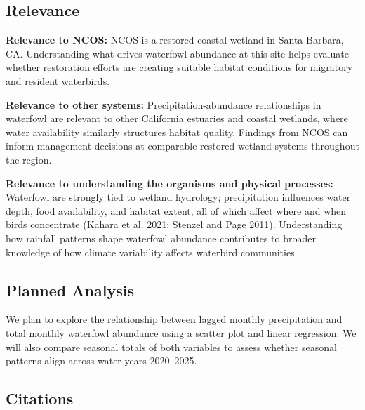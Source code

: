 \documentclass[
  letterpaper,
  DIV=11,
  numbers=noendperiod]{scrartcl}
\begin{document}
\subsection{Relevance}\label{relevance}

\textbf{Relevance to NCOS:} NCOS is a restored coastal wetland in Santa
Barbara, CA. Understanding what drives waterfowl abundance at this site
helps evaluate whether restoration efforts are creating suitable habitat
conditions for migratory and resident waterbirds.

\textbf{Relevance to other systems:} Precipitation-abundance
relationships in waterfowl are relevant to other California estuaries
and coastal wetlands, where water availability similarly structures
habitat quality. Findings from NCOS can inform management decisions at
comparable restored wetland systems throughout the region.

\textbf{Relevance to understanding the organisms and physical
processes:} Waterfowl are strongly tied to wetland hydrology;
precipitation influences water depth, food availability, and habitat
extent, all of which affect where and when birds concentrate (Kahara et
al. 2021; Stenzel and Page 2011). Understanding how rainfall patterns
shape waterfowl abundance contributes to broader knowledge of how
climate variability affects waterbird communities.

\subsection{Planned Analysis}\label{planned-analysis}

We plan to explore the relationship between lagged monthly precipitation
and total monthly waterfowl abundance using a scatter plot and linear
regression. We will also compare seasonal totals of both variables to
assess whether seasonal patterns align across water years 2020--2025.

\subsection{Citations}\label{citations}
\end{document}
